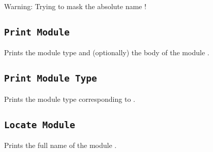 \begin{ErrMsgs}
  \item {}
\end{ErrMsgs}

\begin{Warnings}
  \item Warning: Trying to mask the absolute name {\qualid} !
\end{Warnings}

\subsection{\tt Print Module {\ident}
}

Prints the module type and (optionally) the body of the module {\ident}.

\subsection{\tt Print Module Type {\ident}
}

Prints the module type corresponding to {\ident}.

\subsection{\tt Locate Module {\qualid}
}

Prints the full name of the module {\qualid}.



